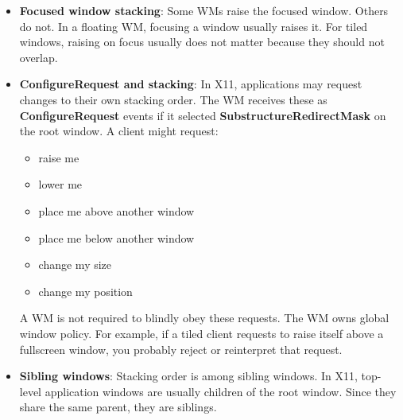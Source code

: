 \documentclass{report}
\begin{document}
\begin{itemize}
\begin{itemize}
                \item confirmation prompts
                \item settings popups
                \item “Save changes?” windows
            \end{itemize}
            In X11, a client can mark a window as transient using:
            \bigbreak \noindent 
            \begin{cppcode}
                XGetTransientForHint(display, win, &parent);
            \end{cppcode}
            \bigbreak \noindent 
            If a window is transient for another window, your WM should usually keep it above its parent.
        \item \textbf{Focused window stacking}: Some WMs raise the focused window. Others do not.
            \bigbreak \noindent 
            In a floating WM, focusing a window usually raises it. For tiled windows, raising on focus usually does not matter because they should not overlap.
        \item \textbf{ConfigureRequest and stacking}: In X11, applications may request changes to their own stacking order. The WM receives these as \textbf{ConfigureRequest} events if it selected \textbf{SubstructureRedirectMask} on the root window.
            \bigbreak \noindent 
            A client might request:
            \begin{itemize}
                \item raise me
                \item lower me
                \item place me above another window
                \item place me below another window
                \item change my size
                \item change my position
            \end{itemize}
            A WM is not required to blindly obey these requests. The WM owns global window policy.
            \bigbreak \noindent 
            For example, if a tiled client requests to raise itself above a fullscreen window, you probably reject or reinterpret that request.
        \item \textbf{Sibling windows}: Stacking order is among sibling windows. In X11, top-level application windows are usually children of the root window. Since they share the same parent, they are siblings.



    \end{itemize}
\end{document}
